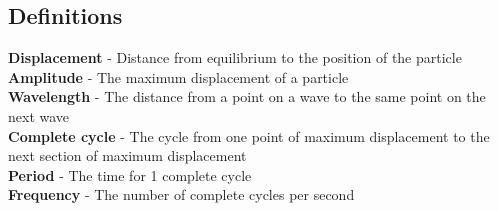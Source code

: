 \documentclass{article}[18pt]
\begin{document}
\subsection{Definitions}
\textbf{Displacement} - Distance from equilibrium  to the position of the particle\\
\textbf{Amplitude} - The maximum displacement of a particle\\
\textbf{Wavelength} - The distance from a point on a wave to the same point on the next wave\\
\textbf{Complete cycle} - The cycle from one point of maximum displacement to the next section of maximum displacement\\
\textbf{Period} - The time for 1 complete cycle\\
\textbf{Frequency} - The number of complete cycles per second
\newpage
\end{document}
